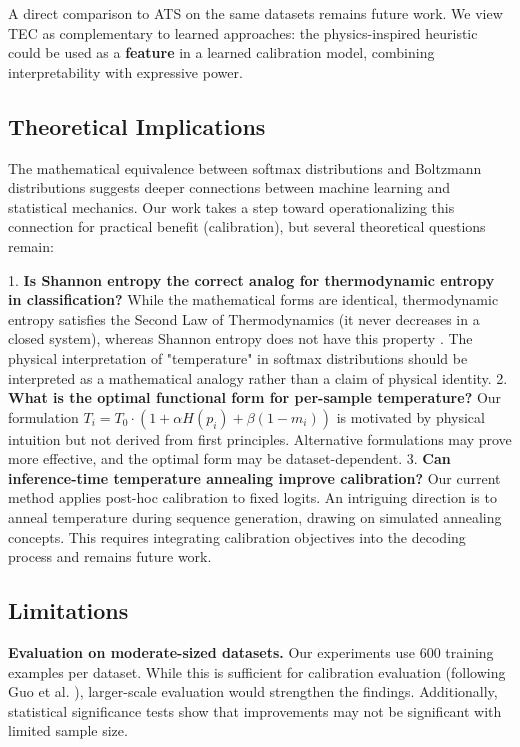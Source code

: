 \documentclass[11pt,letterpaper]{article}
\begin{document}
A direct comparison to ATS on the same datasets remains future work. We view TEC as complementary to learned approaches: the physics-inspired heuristic could be used as a \textbf{feature} in a learned calibration model, combining interpretability with expressive power.

\subsection{Theoretical Implications}

The mathematical equivalence between softmax distributions and Boltzmann distributions suggests deeper connections between machine learning and statistical mechanics. Our work takes a step toward operationalizing this connection for practical benefit (calibration), but several theoretical questions remain:

1. \textbf{Is Shannon entropy the correct analog for thermodynamic entropy in classification?} While the mathematical forms are identical, thermodynamic entropy satisfies the Second Law of Thermodynamics (it never decreases in a closed system), whereas Shannon entropy does not have this property \cite{Jaynes1957}. The physical interpretation of "temperature" in softmax distributions should be interpreted as a mathematical analogy rather than a claim of physical identity.
2. \textbf{What is the optimal functional form for per-sample temperature?} Our formulation $T_i = T_0 \cdot (1 + \alpha H(p_i) + \beta(1-m_i))$ is motivated by physical intuition but not derived from first principles. Alternative formulations may prove more effective, and the optimal form may be dataset-dependent.
3. \textbf{Can inference-time temperature annealing improve calibration?} Our current method applies post-hoc calibration to fixed logits. An intriguing direction is to anneal temperature during sequence generation, drawing on simulated annealing concepts. This requires integrating calibration objectives into the decoding process and remains future work.

\subsection{Limitations}

\textbf{Evaluation on moderate-sized datasets.} Our experiments use 600 training examples per dataset. While this is sufficient for calibration evaluation (following Guo et al. \cite{Guo2017}), larger-scale evaluation would strengthen the findings. Additionally, statistical significance tests show that improvements may not be significant with limited sample size.
\end{document}
